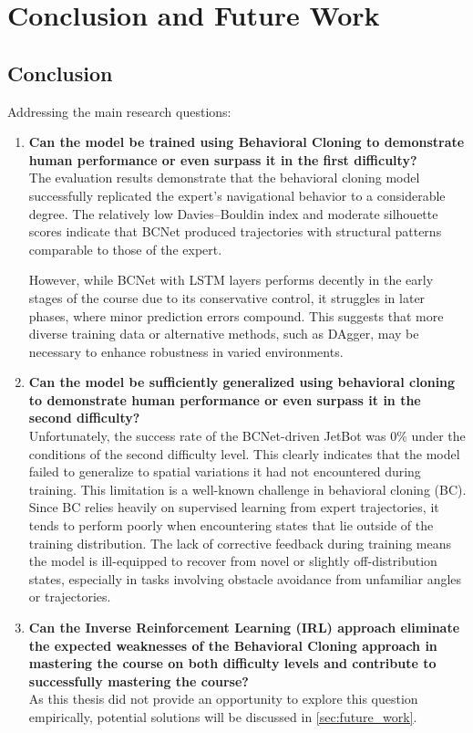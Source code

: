 \chapter{Conclusion and Future Work}
\label{cha:Conclusion}

\section{Conclusion}

Addressing the main research questions:

\begin{enumerate}
  \item \textbf{Can the model be trained using Behavioral Cloning to demonstrate human performance or even surpass it in the first difficulty?} \\
    The evaluation results demonstrate that the behavioral cloning model successfully replicated the expert’s navigational behavior to a considerable degree. The relatively low Davies–Bouldin index and moderate silhouette scores indicate that BCNet produced trajectories with structural patterns comparable to those of the expert.

    However, while BCNet with LSTM layers performs decently in the early stages of the course due to its conservative control, it struggles in later phases, where minor prediction errors compound. This suggests that more diverse training data or alternative methods, such as DAgger, may be necessary to enhance robustness in varied environments.

  \item \textbf{Can the model be sufficiently generalized using behavioral cloning to demonstrate human performance or even surpass it in the second difficulty?} \\
    Unfortunately, the success rate of the BCNet-driven JetBot was 0\% under the conditions of the second difficulty level. This clearly indicates that the model failed to generalize to spatial variations it had not encountered during training. This limitation is a well-known challenge in behavioral cloning (BC). Since BC relies heavily on supervised learning from expert trajectories, it tends to perform poorly when encountering states that lie outside of the training distribution. The lack of corrective feedback during training means the model is ill-equipped to recover from novel or slightly off-distribution states, especially in tasks involving obstacle avoidance from unfamiliar angles or trajectories.

  \item \textbf{Can the Inverse Reinforcement Learning (IRL) approach eliminate the expected weaknesses of the Behavioral Cloning approach in mastering the course on both difficulty levels and contribute to successfully mastering the course?} \\
    As this thesis did not provide an opportunity to explore this question empirically, potential solutions will be discussed in \autoref{sec:future_work}.
\end{enumerate}

